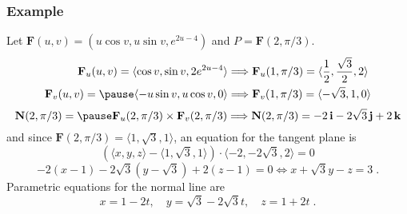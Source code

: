 
\begin{frame}
  \frametitle{Example}

  Let $\textbf{F}(u,v) = (u\cos{v}, u\sin{v}, e^{2u-4})$ and $P=\textbf{F}(2, \pi/3)$. \pause
%
\begin{align*}
  \textbf{F}_u(u,v) =  \langle \cos{v}, \sin{v}, 2e^{2u-4}\rangle & \Longrightarrow \textbf{F}_u(1,\pi/3) = \langle \frac{1}{2}, \frac{\sqrt{3}}{2}, 2\rangle \\
  \textbf{F}_v(u,v) = \pause \langle -u\sin{v}, u\cos{v}, 0 \rangle & \Longrightarrow \textbf{F}_v(1,\pi/3) = \langle -\sqrt{3}, 1, 0 \rangle
\end{align*}
%
\pause
%
$$\textbf{N}(2,\pi/3) = \pause \textbf{F}_u(2,\pi/3) \times \textbf{F}_v(2,\pi/3)  \Longrightarrow \textbf{N}(2,\pi/3) = -2 \, \textbf{i} - 2\sqrt{3}\, \textbf{j} + 2\,\textbf{k}$$
%
and since $\textbf{F}(2,\pi/3) = \langle 1, \sqrt{3},1\rangle$, an equation for the tangent plane is\pause
%
$$(\langle x,y,z\rangle - \langle 1, \sqrt{3},1\rangle) \cdot \langle -2, -2\sqrt{3}, 2\rangle = 0$$
%
$$-2(x-1) -2\sqrt{3}(y-\sqrt{3}) +2(z-1) = 0 \Longleftrightarrow x + \sqrt{3} y -z = 3\; .$$
\pause
Parametric equations for the normal line are\pause
%
$$x= 1-2t, \quad y=\sqrt{3} -2\sqrt{3} t,\quad z = 1+2t\; .$$
\end{frame}